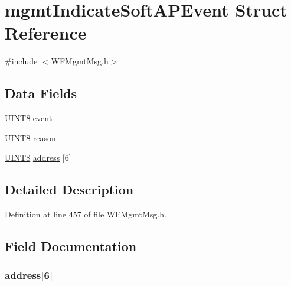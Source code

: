\hypertarget{structmgmt_indicate_soft_a_p_event}{}\section{mgmt\+Indicate\+Soft\+A\+P\+Event Struct Reference}
\label{structmgmt_indicate_soft_a_p_event}


{\ttfamily \#include $<$W\+F\+Mgmt\+Msg.\+h$>$}

\subsection*{Data Fields}
\begin{DoxyCompactItemize}
\item 
\hyperlink{_generic_type_defs_8h_ab27e9918b538ce9d8ca692479b375b6a}{U\+I\+N\+T8} \hyperlink{structmgmt_indicate_soft_a_p_event_a1cf9104de23558de5618e652cf66a489}{event}
\item 
\hyperlink{_generic_type_defs_8h_ab27e9918b538ce9d8ca692479b375b6a}{U\+I\+N\+T8} \hyperlink{structmgmt_indicate_soft_a_p_event_a8a1f56973f869a1f505953998d9f77af}{reason}
\item 
\hyperlink{_generic_type_defs_8h_ab27e9918b538ce9d8ca692479b375b6a}{U\+I\+N\+T8} \hyperlink{structmgmt_indicate_soft_a_p_event_acbb8adb01a9a9295c958cec09a197143}{address} \mbox{[}6\mbox{]}
\end{DoxyCompactItemize}


\subsection{Detailed Description}


Definition at line 457 of file W\+F\+Mgmt\+Msg.\+h.



\subsection{Field Documentation}
\hypertarget{structmgmt_indicate_soft_a_p_event_acbb8adb01a9a9295c958cec09a197143}{}
\subsubsection[{address}]{ address\mbox{[}6\mbox{]}}\label{structmgmt_indicate_soft_a_p_event_acbb8adb01a9a9295c958cec09a197143}


